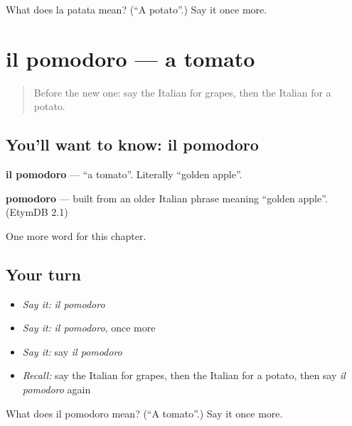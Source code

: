 \begin{tcolorbox}[breakable,colback=teal!4,colframe=teal!35!black,title={Before you move on}]
What does la patata mean? (\textquotedblleft{}A potato\textquotedblright{}.) Say it once more.
\end{tcolorbox}
\section[il pomodoro]{il pomodoro — a tomato}

\label{lesson:IT-C53-pomodoro}



\begin{quote}
Before the new one: say the Italian for grapes, then the Italian for a potato.
\end{quote}

\subsection*{You'll want to know: il pomodoro}
\textbf{il pomodoro} — \textquotedblleft{}a tomato\textquotedblright{}. Literally \textquotedblleft{}golden apple\textquotedblright{}.

\begin{cousinweb}
\textbf{pomodoro} — built from an older Italian phrase meaning \textquotedblleft{}golden apple\textquotedblright{}. (EtymDB 2.1)
\end{cousinweb}

\begin{grammarlens}[title={What you've built}]
One more word for this chapter.
\end{grammarlens}

\subsection*{Your turn}
\begin{itemize}
\raggedright
  \item \emph{Say it:} \emph{il pomodoro}
  \item \emph{Say it:} \emph{il pomodoro}, once more
  \item \emph{Say it:} say \emph{il pomodoro}
  \item \emph{Recall:} say the Italian for grapes, then the Italian for a potato, then say \emph{il pomodoro} again
\end{itemize}

\begin{tcolorbox}[breakable,colback=teal!4,colframe=teal!35!black,title={Before you move on}]
What does il pomodoro mean? (\textquotedblleft{}A tomato\textquotedblright{}.) Say it once more.
\end{tcolorbox}

